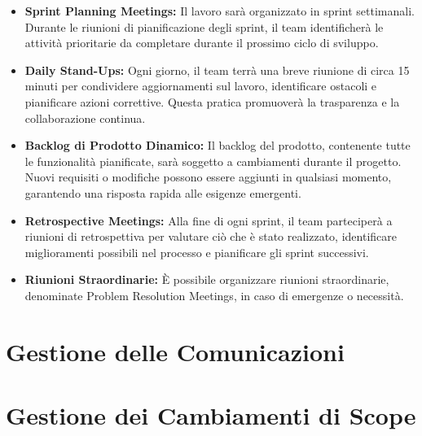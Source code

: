 \begin{itemize}
    \item \textbf{Sprint Planning Meetings:} Il lavoro sarà organizzato in sprint settimanali. Durante le riunioni di pianificazione degli sprint, il team identificherà le attività prioritarie da completare durante il prossimo ciclo di sviluppo.
    \item \textbf{Daily Stand-Ups:} Ogni giorno, il team terrà una breve riunione di circa 15 minuti per condividere aggiornamenti sul lavoro, identificare ostacoli e pianificare azioni correttive. Questa pratica promuoverà la trasparenza e la collaborazione continua.
    \item \textbf{Backlog di Prodotto Dinamico:} Il backlog del prodotto, contenente tutte le funzionalità pianificate, sarà soggetto a cambiamenti durante il progetto. Nuovi requisiti o modifiche possono essere aggiunti in qualsiasi momento, garantendo una risposta rapida alle esigenze emergenti.
    \item \textbf{Retrospective Meetings:} Alla fine di ogni sprint, il team parteciperà a riunioni di retrospettiva per valutare ciò che è stato realizzato, identificare miglioramenti possibili nel processo e pianificare gli sprint successivi.
    \item \textbf{Riunioni Straordinarie:} È possibile organizzare riunioni straordinarie, denominate Problem Resolution Meetings, in caso di emergenze o necessità.
\end{itemize}

\section{Gestione delle Comunicazioni}


\section{Gestione dei Cambiamenti di Scope}

